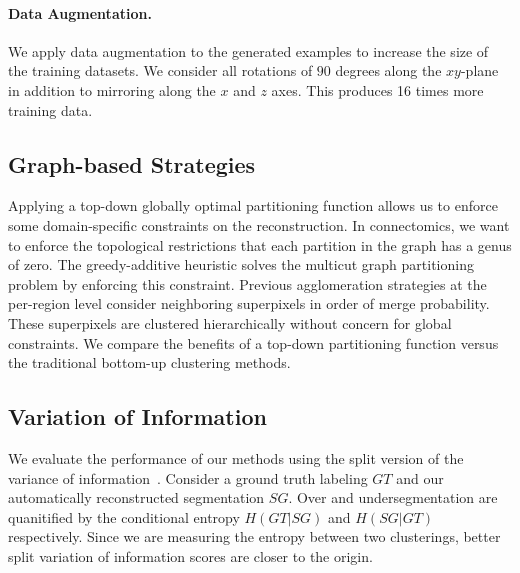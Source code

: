 \paragraph{Data Augmentation.}
We apply data augmentation to the generated examples to increase the size of the training datasets. 
We consider all rotations of $90$ degrees along the $xy$-plane in addition to mirroring along the $x$ and $z$ axes. 
This produces 16 times more training data. 

\subsection{Graph-based Strategies}

Applying a top-down globally optimal partitioning function allows us to enforce some domain-specific constraints on the reconstruction.
In connectomics, we want to enforce the topological restrictions that each partition in the graph has a genus of zero. 
The greedy-additive heuristic solves the multicut graph partitioning problem by enforcing this constraint.
Previous agglomeration strategies at the per-region level consider neighboring superpixels in order of merge probability. 
These superpixels are clustered hierarchically without concern for global constraints.
We compare the benefits of a top-down partitioning function versus the traditional bottom-up clustering methods.

\subsection{Variation of Information}

We evaluate the performance of our methods using the split version of the variance of information~\cite{meila2003comparing}. 
Consider a ground truth labeling $GT$ and our automatically reconstructed segmentation $SG$. 
Over and undersegmentation are quanitified by the conditional entropy $H(GT | SG)$ and $H(SG | GT)$ respectively. 
Since we are measuring the entropy between two clusterings, better split variation of information scores are closer to the origin.